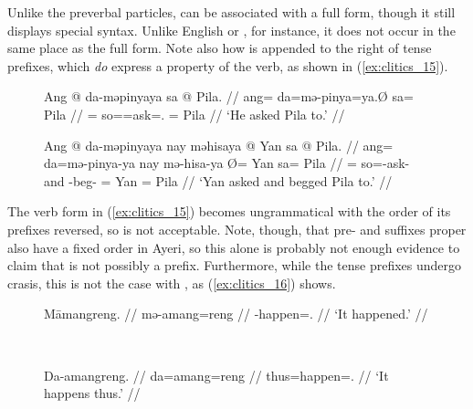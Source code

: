Unlike the preverbal particles,  can be associated with a full
form, though it still displays special syntax. Unlike English
 or , for instance, it does not occur in the same place as
the full form. Note also how  is appended to the right of tense
prefixes, which \emph{do} express a property of the verb, as shown in 
(\ref{ex:clitics_15}).

\begin{figure}[h]
\pex\label{ex:clitics_15}
\a\label{ex:clitics_15a}\begingl
	\gla Ang @ da-məpinyaya sa @ Pila. //
	\glb ang= da=mə-pinya=ya.Ø sa= Pila //
	\glc \AgtT{}= so=\Pst{}=ask=\TsgM{}.\Top{} \Parg{}= Pila //
	\glft `He asked Pila to.' //
\endgl

\a\label{ex:clitics_15b}\begingl
	\gla Ang @ da-məpinyaya nay məhisaya {} @ Yan sa @ Pila. //
	\glb ang= da=mə-pinya-ya nay mə-hisa-ya Ø= Yan sa= Pila //
	\glc \AgtT{}= so=\Pst{}-ask-\TsgM{} and \Pst{}-beg-\TsgM{} \Top{}= Yan 
		\Parg{}= Pila //
	\glft `Yan asked and begged Pila to.' //
\endgl
\xe
\end{figure}

The verb form in (\ref{ex:clitics_15}) becomes ungrammatical with the order of
its prefixes reversed, so  is not acceptable.
Note, though, that pre- and suffixes proper also have a fixed order in Ayeri,
so this alone is probably not enough evidence to claim that  is
not possibly a prefix. Furthermore, while the tense prefixes undergo crasis,
this is not the case with , as (\ref{ex:clitics_16}) shows.

\begin{figure}[h]
\begin{minipage}[t]{.5\linewidth}
\pex\label{ex:clitics_17}
\a\label{ex:clitics_17a}\begingl
	\gla Māmangreng. //
	\glb mə-amang=reng //
	\glc \Pst{}-happen=\TsgI{}.\Aarg{} //
	\glft `It happened.' //
\endgl

\a\label{ex:clitics_17b}\ljudge{*} 
\xe
\end{minipage}
~
\begin{minipage}[t]{.5\linewidth}
\pex\label{ex:clitics_16}
\a\label{ex:clitics_16a}\begingl
	\gla Da-amangreng. //
	\glb da=amang=reng //
	\glc thus=happen=\TsgI{}.\Aarg{} //
	\glft `It happens thus.' //
\endgl

\a\label{ex:clitics_16b}\ljudge{*} 
\xe
\end{minipage}
\end{figure}

